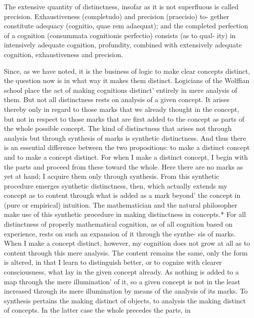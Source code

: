     The extensive quantity of distinctness, insofar as it is not superfluous is
    called precision. Exhaustiveness (completudo) and precision (praecisio) to-
    gether constitute adequacy (cognitio, quae rem adaequat); and the completed
    perfection of a cognition (consummata cognitionis perfectio) consists (as to qual-
    ity) in intensively adequate cognition, profundity, combined with extensively
    adequate cognition, exhaustiveness and precision.

    Since, as we have noted, it is the business of logic to make clear concepts
    distinct, the question now is in what way it makes them distinct.
    Logicians of the Wolffian school place the act of making cognitions
    distinct' entirely in mere analysis of them. But not all distinctness rests on
    analysis of a given concept. It arises thereby only in regard to those marks
    that we already thought in the concept, but not in respect to those marks
    that are first added to the concept as parts of the whole possible concept.
    The kind of distinctness that arises not through analysis but through
    synthesis of marks is synthetic distinctness. And thus there is an essential
    difference between the two propositions: to make a distinct concept and to
    make a concept distinct.
    For when I make a distinct concept, I begin with the parts and proceed
    from these toward the whole. Here there are no marks as yet at hand; I
    acquire them only through synthesis. From this synthetic procedure
    emerges synthetic distinctness, then, which actually extends my concept
    as to content through what is added as a mark beyond' the concept in (pure
    or empirical) intuition. The mathematician and the natural philosopher
    make use of this synthetic procedure in making distinctness in concepts.*
    For all distinctness of properly mathematical cognition, as of all cognition
    based on experience, rests on such an expansion of it through the synthe-
    sis of marks.
    When I make a concept distinct, however, my cognition does not grow
    at all as to content through this mere analysis. The content remains the
    same, only the form is altered, in that I learn to distinguish better, or to
    cognize with clearer consciousness, what lay in the given concept already.
    As nothing is added to a map through the mere illumination' of it, so a
    given concept is not in the least increased through its mere illumination
    by means of the analysis of its marks.
    To synthesis pertains the making distinct of objects, to analysis the
    making distinct of concepts. In the latter case the whole precedes the parts, in

